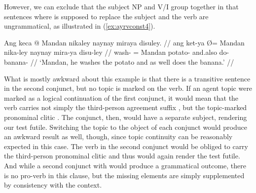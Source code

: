 \begin{figure}

\xe
\end{figure}

However, we can exclude that the subject NP and V/I group together in that
sentences where  is supposed to replace the subject and
the verb are ungrammatical, as illustrated in (\ref{ex:ayrvconst4}).

\ex\label{ex:ayrvconst4}%
\ljudge*\begingl
\gla Ang keca {} @ Mandan nikaley naynay miraya disuley. //
\glb ang ket-ya Ø= Mandan nika-ley naynay mira-ya disu-ley //
\glc \AgtT{} wash-\TsgM{} \Top{}= Mandan potato-\PargI{} and.also do-\TsgM{}
	banana-\PargI{} //
\glft `Mandan, he washes the potato and as well does the banana.' //
\endgl\xe

What is mostly awkward about this example is that there is a transitive
sentence in the second conjunct, but no topic is marked on the verb. If an
agent topic were marked as a logical continuation of the first conjunct, it
would mean that the verb carries not simply the third-person agreement suffix
, but the topic-marked pronominal clitic
. The conjunct, then, would have a separate subject,
rendering our test futile. Switching the topic to the object of each conjunct
would produce an awkward result as well, though, since topic continuity can be
reasonably expected in this case. The verb in the second conjunct would be
obliged to carry the third-person pronominal clitic 
and thus would again render the test futile. And while a second conjunct with
 would produce a
grammatical outcome, there is no pro-verb in this clause, but the missing
elements are simply supplemented by consistency with the context.

